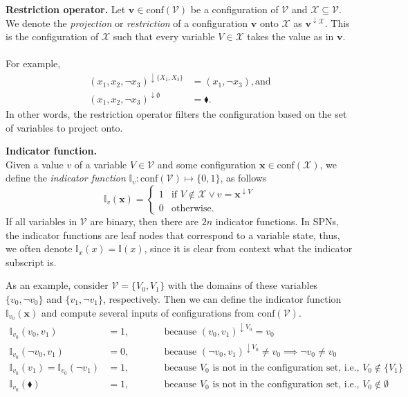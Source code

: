 \documentclass{article}
\begin{document}
\begin{theorem}
    \textbf{Restriction operator.} Let $\mathbf{v} \in \text{conf}(\mathcal{V})$ be a configuration of $\mathcal{V}$ and $\mathcal{X} \subseteq \mathcal{V}$. We denote the \textit{projection} or \textit{restriction} of a configuration $\mathbf{v}$ onto $\mathcal{X}$ as $\mathbf{v}^{\downarrow \mathcal{X}}$. This is the configuration of $\mathcal{X}$ such that every variable $V \in \mathcal{X}$ takes the value as in $\mathbf{v}$.
    \\\\
    For example,
    \begin{align*}
        (x_1, x_2, \neg x_3)^{\downarrow\{X_1, X_3\}} &= (x_1, \neg x_3), \text{and}\\
        (x_1, x_2, \neg x_3)^{\downarrow \emptyset} &= \blacklozenge .
    \end{align*}
    In other words, the restriction operator filters the configuration based on the set of variables to project onto. 
\end{theorem}

\begin{theorem}
    \textbf{Indicator function.} \\
    Given a value $v$ of a variable $V \in \mathcal{V}$ and some configuration $\mathbf{x} \in \text{conf}(\mathcal{X})$, we define the \textit{indicator function} $\mathbb{I}_v: \text{conf}(\mathcal{V}) \mapsto \{0, 1\}$, as follows
    $$
        \mathbb{I}_v(\mathbf{x}) = 
        \begin{cases}
            1 & \text{if } V \notin \mathcal{X} \lor v = \mathbf{x}^{\downarrow V}\\
            0 & \text{otherwise} .
        \end{cases}
    $$
    If all variables in $\mathcal{V}$ are binary, then there are $2n$ indicator functions. In SPNs, the indicator functions are leaf nodes that correspond to a variable state, thus, we often denote $\mathbb{I}_x(x) = \mathbb{I}(x)$, since it is clear from context what the indicator subscript is.
\end{theorem}

\noindent As an example, consider $\mathcal{V} = \{V_0, V_1\}$ with the domains of these variables $\{v_0, \neg v_0\}$ and $\{v_1, \neg v_1\}$, respectively. Then we can define the indicator function $\mathbb{I}_{v_0}(\mathbf{x})$ and compute several inputs of configurations from $\text{conf}(\mathcal{V})$.
\begin{align*}
    \mathbb{I}_{v_0}(v_0, v_1) &= 1, &\qquad& \text{because $(v_0, v_1)^{\downarrow V_0} = v_0$} \\
    \mathbb{I}_{v_0}(\neg v_0, v_1) &= 0, &\qquad& \text{because $(\neg v_0, v_1)^{\downarrow V_0} \neq v_0 \implies \neg v_0 \neq v_0$} \\
    \mathbb{I}_{v_0}(v_1) = \mathbb{I}_{v_0}(\neg v_1) &= 1, &\qquad& \text{because $V_0$ is not in the configuration set, i.e., $V_0 \notin \{V_1\}$}\\
    \mathbb{I}_{v_0}(\blacklozenge) &= 1, &\qquad& \text{because $V_0$ is not in the configuration set, i.e., $V_0 \notin \emptyset$}
\end{align*}
\end{document}
